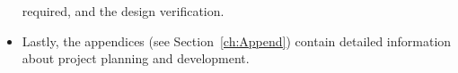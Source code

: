 \begin{itemize}
required, and the design verification.
\item Lastly, the appendices (see Section~\ref{ch:Append}) contain detailed
  information about project planning and development.
\end{itemize}


